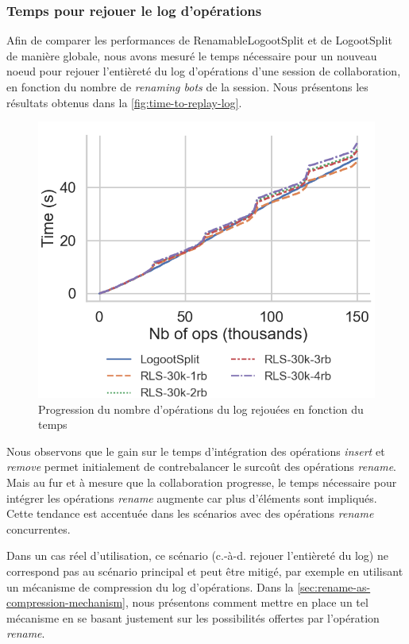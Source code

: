 \documentclass[12pt]{thesul}
\newcommand{\ie}{c.-à-d. }
\begin{document}
\subsubsection{Temps pour rejouer le log d'opérations}

Afin de comparer les performances de RenamableLogootSplit et de LogootSplit de manière globale, nous avons mesuré le temps nécessaire pour un nouveau noeud pour rejouer l'entièreté du log d'opérations d'une session de collaboration, en fonction du nombre de \emph{renaming bots} de la session.
Nous présentons les résultats obtenus dans la \autoref{fig:time-to-replay-log}.

\begin{figure}[!ht]
  \centering
  \includegraphics[width=0.7\columnwidth]{img/replay-log-30k-with-legend.png}
  \caption{Progression du nombre d'opérations du log rejouées en fonction du temps}
  \label{fig:time-to-replay-log}
\end{figure}

Nous observons que le gain sur le temps d'intégration des opérations \emph{insert} et \emph{remove} permet initialement de contrebalancer le surcoût des opérations \emph{rename}.
Mais au fur et à mesure que la collaboration progresse, le temps nécessaire pour intégrer les opérations \emph{rename} augmente car plus d'éléments sont impliqués.
Cette tendance est accentuée dans les scénarios avec des opérations \emph{rename} concurrentes.

Dans un cas réel d'utilisation, ce scénario (\ie rejouer l'entièreté du log) ne correspond pas au scénario principal et peut être mitigé, par exemple en utilisant un mécanisme de compression du log d'opérations.
Dans la \autoref{sec:rename-as-compression-mechanism}, nous présentons comment mettre en place un tel mécanisme en se basant justement sur les possibilités offertes par l'opération \emph{rename}.
\end{document}
